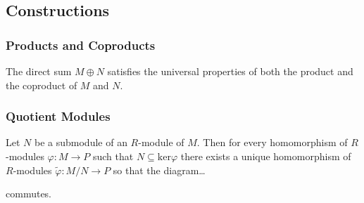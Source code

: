 \subsection{Constructions}\label{rmoduleconstructions}

\subsubsection{Products and Coproducts}\label{productmodules}

\begin{proposition}
The direct sum $M \oplus N$ satisfies the universal properties of both the product and the coproduct of $M$ and $N$.
\end{proposition}

\subsubsection{Quotient Modules}\label{modulequotients}
\begin{theorem}
\label{quotientrmodulethm}
Let $N$ be a submodule of an $R$-module of $M$. Then for every homomorphism of $R$-modules
$\varphi : M \rightarrow P$ such that $N \subseteq \textrm{ker} \varphi$ there exists a unique
homomorphism of $R$-modules $\tilde \varphi : M/N \rightarrow P$ so that the diagram\dots
\begin{figure}[H]
\centering

\end{figure}
\noindent commutes.
\end{theorem}